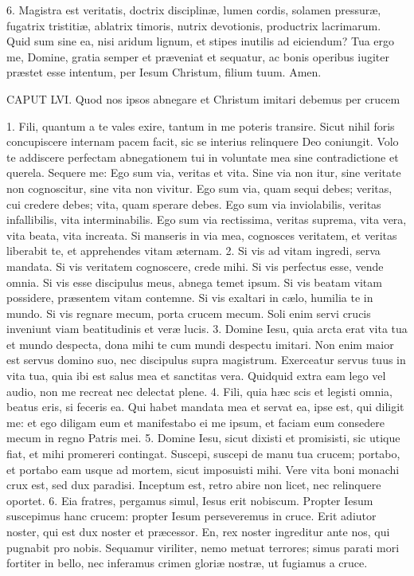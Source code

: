 \documentclass[twoside]{article}
\begin{document}
6. Magistra est veritatis, doctrix disciplinæ, lumen cordis, solamen pressuræ, fugatrix tristitiæ, ablatrix timoris, nutrix devotionis, productrix lacrimarum. Quid sum sine ea, nisi aridum lignum, et stipes inutilis ad eiciendum? Tua ergo me, Domine, gratia semper et præveniat et sequatur, ac bonis operibus iugiter præstet esse intentum, per Iesum Christum, filium tuum. Amen.


CAPUT LVI.
Quod nos ipsos abnegare et Christum imitari debemus per crucem

1. Fili, quantum a te vales exire, tantum in me poteris transire. Sicut nihil foris concupiscere internam pacem facit, sic se interius relinquere Deo coniungit. Volo te addiscere perfectam abnegationem tui in voluntate mea sine contradictione et querela. Sequere me: Ego sum via, veritas et vita. Sine via non itur, sine veritate non cognoscitur, sine vita non vivitur. Ego sum via, quam sequi debes; veritas, cui credere debes; vita, quam sperare debes. Ego sum via inviolabilis, veritas infallibilis, vita interminabilis. Ego sum via rectissima, veritas suprema, vita vera, vita beata, vita increata. Si manseris in via mea, cognosces veritatem, et veritas liberabit te, et apprehendes vitam æternam.
2. Si vis ad vitam ingredi, serva mandata. Si vis veritatem cognoscere, crede mihi. Si vis perfectus esse, vende omnia. Si vis esse discipulus meus, abnega temet ipsum. Si vis beatam vitam possidere, præsentem vitam contemne. Si vis exaltari in cælo, humilia te in mundo. Si vis regnare mecum, porta crucem mecum. Soli enim servi crucis inveniunt viam beatitudinis et veræ lucis.
3. Domine Iesu, quia arcta erat vita tua et mundo despecta, dona mihi te cum mundi despectu imitari. Non enim maior est servus domino suo, nec discipulus supra magistrum. Exerceatur servus tuus in vita tua, quia ibi est salus mea et sanctitas vera. Quidquid extra eam lego vel audio, non me recreat nec delectat plene.
4. Fili, quia hæc scis et legisti omnia, beatus eris, si feceris ea. Qui habet mandata mea et servat ea, ipse est, qui diligit me: et ego diligam eum et manifestabo ei me ipsum, et faciam eum consedere mecum in regno Patris mei.
5. Domine Iesu, sicut dixisti et promisisti, sic utique fiat, et mihi promereri contingat. Suscepi, suscepi de manu tua crucem; portabo, et portabo eam usque ad mortem, sicut imposuisti mihi. Vere vita boni monachi crux est, sed dux paradisi. Inceptum est, retro abire non licet, nec relinquere oportet.
6. Eia fratres, pergamus simul, Iesus erit nobiscum. Propter Iesum suscepimus hanc crucem: propter Iesum perseveremus in cruce. Erit adiutor noster, qui est dux noster et præcessor. En, rex noster ingreditur ante nos, qui pugnabit pro nobis. Sequamur viriliter, nemo metuat terrores; simus parati mori fortiter in bello, nec inferamus crimen gloriæ nostræ, ut fugiamus a cruce.
\end{document}
